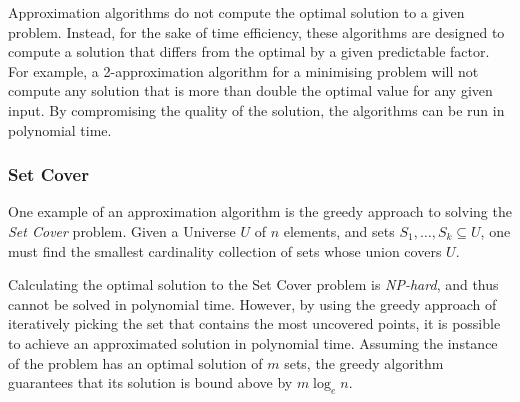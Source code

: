 Approximation algorithms do not compute the optimal solution to a given problem. Instead, for the sake of time efficiency, these algorithms are designed to compute a solution that differs from the optimal by a given predictable factor. For example, a 2-approximation algorithm for a minimising problem will not compute any solution that is more than double the optimal value for any given input. By compromising the quality of the solution, the algorithms can be run in polynomial time.

\subsubsection*{Set Cover}
One example of an approximation algorithm is the greedy approach to solving the \emph{Set Cover} problem. Given a Universe $U$ of $n$ elements, and sets $S_1,\dotsc,S_k \subseteq U$, one must find the smallest cardinality collection of sets whose union covers $U$.

Calculating the optimal solution to the Set Cover problem is \emph{NP-hard}, and thus cannot be solved in polynomial time. However, by using the greedy approach of iteratively picking the set that contains the most uncovered points, it is possible to achieve an approximated solution in polynomial time. Assuming the instance of the problem has an optimal solution of $m$ sets, the greedy algorithm guarantees that its solution is bound above by $m \log_e n$.


